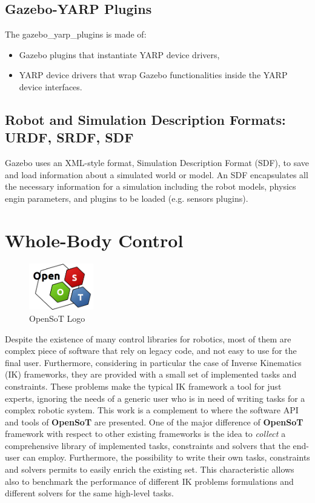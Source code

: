 \subsection{Gazebo-YARP Plugins}
The gazebo\_yarp\_plugins is made of:
\begin{itemize}
    \item Gazebo plugins that instantiate YARP device drivers,
    \item YARP device drivers that wrap Gazebo functionalities inside the YARP device interfaces.
\end{itemize}

\subsection{Robot and Simulation Description Formats: URDF, SRDF, SDF}
Gazebo uses an XML-style format, Simulation Description Format (SDF), to save and load information about a simulated world or model. An SDF encapsulates all the necessary information for a simulation including the robot models, physics engin parameters, and plugins to be loaded (e.g. sensors plugins).


\section{Whole-Body Control}
\begin{figure}
  \begin{center}
    \includegraphics[width=0.25\textwidth]{images/openSoT_stickers}
  \end{center}
  \caption{OpenSoT Logo}
\end{figure}
Despite the existence of many control libraries for robotics, most of them are complex piece of software that rely on legacy code, and not easy to use for the final user. Furthermore, considering in particular the case of Inverse Kinematics (IK) frameworks, they are provided with a small set of implemented tasks and constraints. These problems make the typical IK framework a tool for just experts, ignoring the needs of a generic user who is in need of writing tasks for a complex robotic system. This work is a complement to \cite{rocchimingo:16} where the software API and tools of \textbf{OpenSoT} are presented. One of the major difference of \textbf{OpenSoT} framework with respect to other existing frameworks is the idea to \emph{collect} a comprehensive library of implemented tasks, constraints and solvers that the end-user can employ. Furthermore, the possibility to write their own tasks, constraints and solvers permits to easily enrich the existing set. This characteristic allows also to benchmark the performance of different IK problems formulations and different solvers for the same high-level tasks. 

